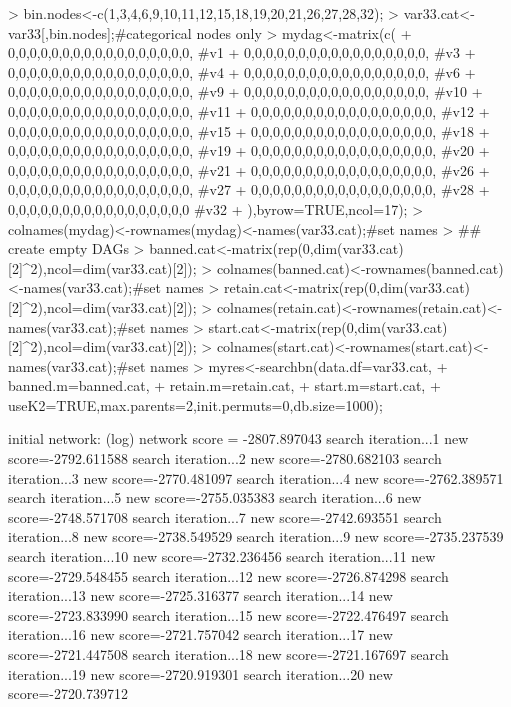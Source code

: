 \documentclass[nojss]{jss}
\begin{document}
\begin{Schunk}
\begin{Sinput}
> bin.nodes<-c(1,3,4,6,9,10,11,12,15,18,19,20,21,26,27,28,32); 
> var33.cat<-var33[,bin.nodes];#categorical nodes only
> mydag<-matrix(c(
+                  0,0,0,0,0,0,0,0,0,0,0,0,0,0,0,0,0, #v1
+                  0,0,0,0,0,0,0,0,0,0,0,0,0,0,0,0,0, #v3
+                  0,0,0,0,0,0,0,0,0,0,0,0,0,0,0,0,0, #v4  
+                  0,0,0,0,0,0,0,0,0,0,0,0,0,0,0,0,0, #v6  
+                  0,0,0,0,0,0,0,0,0,0,0,0,0,0,0,0,0, #v9  
+                  0,0,0,0,0,0,0,0,0,0,0,0,0,0,0,0,0, #v10  
+                  0,0,0,0,0,0,0,0,0,0,0,0,0,0,0,0,0, #v11  
+                  0,0,0,0,0,0,0,0,0,0,0,0,0,0,0,0,0, #v12  
+                  0,0,0,0,0,0,0,0,0,0,0,0,0,0,0,0,0, #v15  
+                  0,0,0,0,0,0,0,0,0,0,0,0,0,0,0,0,0, #v18 
+                  0,0,0,0,0,0,0,0,0,0,0,0,0,0,0,0,0, #v19
+                  0,0,0,0,0,0,0,0,0,0,0,0,0,0,0,0,0, #v20 
+                  0,0,0,0,0,0,0,0,0,0,0,0,0,0,0,0,0, #v21 
+                  0,0,0,0,0,0,0,0,0,0,0,0,0,0,0,0,0, #v26 
+                  0,0,0,0,0,0,0,0,0,0,0,0,0,0,0,0,0, #v27 
+                  0,0,0,0,0,0,0,0,0,0,0,0,0,0,0,0,0, #v28 
+                  0,0,0,0,0,0,0,0,0,0,0,0,0,0,0,0,0  #v32 
+               ),byrow=TRUE,ncol=17); 
> colnames(mydag)<-rownames(mydag)<-names(var33.cat);#set names
> ## create empty DAGs
> banned.cat<-matrix(rep(0,dim(var33.cat)[2]^2),ncol=dim(var33.cat)[2]);
> colnames(banned.cat)<-rownames(banned.cat)<-names(var33.cat);#set names
> retain.cat<-matrix(rep(0,dim(var33.cat)[2]^2),ncol=dim(var33.cat)[2]);
> colnames(retain.cat)<-rownames(retain.cat)<-names(var33.cat);#set names
> start.cat<-matrix(rep(0,dim(var33.cat)[2]^2),ncol=dim(var33.cat)[2]);
> colnames(start.cat)<-rownames(start.cat)<-names(var33.cat);#set names
> myres<-searchbn(data.df=var33.cat,
+                 banned.m=banned.cat,
+                 retain.m=retain.cat,
+                 start.m=start.cat,
+                 useK2=TRUE,max.parents=2,init.permuts=0,db.size=1000);
\end{Sinput}
\begin{Soutput}
initial network: (log) network score = -2807.897043
search iteration...1 new score=-2792.611588
search iteration...2 new score=-2780.682103
search iteration...3 new score=-2770.481097
search iteration...4 new score=-2762.389571
search iteration...5 new score=-2755.035383
search iteration...6 new score=-2748.571708
search iteration...7 new score=-2742.693551
search iteration...8 new score=-2738.549529
search iteration...9 new score=-2735.237539
search iteration...10 new score=-2732.236456
search iteration...11 new score=-2729.548455
search iteration...12 new score=-2726.874298
search iteration...13 new score=-2725.316377
search iteration...14 new score=-2723.833990
search iteration...15 new score=-2722.476497
search iteration...16 new score=-2721.757042
search iteration...17 new score=-2721.447508
search iteration...18 new score=-2721.167697
search iteration...19 new score=-2720.919301
search iteration...20 new score=-2720.739712
\end{Soutput}
\end{Schunk}
\end{document}
